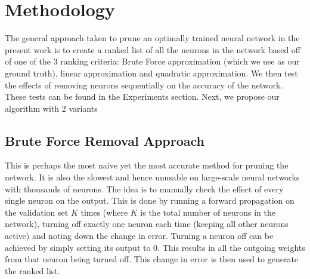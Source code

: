 \section{Methodology}
The general approach taken to prune an optimally trained neural network in the present work is to create a ranked list of all the neurons in the network based off of one of the 3 ranking criteria: Brute Force approximation (which we use as our ground truth), linear approximation and quadratic approximation. We then test the effects of removing neurons sequentially on the accuracy of the network. These tests can be found in the Experiments section. Next, we propose our algorithm with 2 variants

\subsection{Brute Force Removal Approach}
This is perhaps the most naive yet the most accurate method for pruning the network. It is also the slowest and hence unusable on large-scale neural networks with thousands of neurons. The idea is to manually check the effect of every single neuron on the output. This is done by running a forward propagation on the validation set $K$ times (where $K$ is the total number of neurons in the network), turning off exactly one neuron each time (keeping all other neurons active) and noting down the change in error. Turning a neuron off can be achieved by simply setting its output to 0. This results in all the outgoing weights from that neuron being turned off. This change in error is then used to generate the ranked list. 





